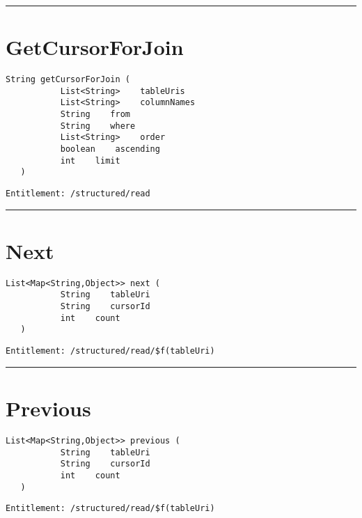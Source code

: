 \rule{12cm}{2pt}
\section{GetCursorForJoin}
\label{Api:GetCursorForJoin}
\begin{lstlisting}[style=nonumbers]
   String getCursorForJoin (
           List<String>    tableUris
           List<String>    columnNames
           String    from
           String    where
           List<String>    order
           boolean    ascending
           int    limit
   )
\end{lstlisting}
\begin{Verbatim}[formatcom=\color{Maroon}]
  Entitlement: /structured/read
\end{Verbatim}



\rule{12cm}{2pt}
\section{Next}
\label{Api:Next}
\begin{lstlisting}[style=nonumbers]
   List<Map<String,Object>> next (
           String    tableUri
           String    cursorId
           int    count
   )
\end{lstlisting}
\begin{Verbatim}[formatcom=\color{Maroon}]
  Entitlement: /structured/read/$f(tableUri)
\end{Verbatim}



\rule{12cm}{2pt}
\section{Previous}
\label{Api:Previous}
\begin{lstlisting}[style=nonumbers]
   List<Map<String,Object>> previous (
           String    tableUri
           String    cursorId
           int    count
   )
\end{lstlisting}
\begin{Verbatim}[formatcom=\color{Maroon}]
  Entitlement: /structured/read/$f(tableUri)
\end{Verbatim}



